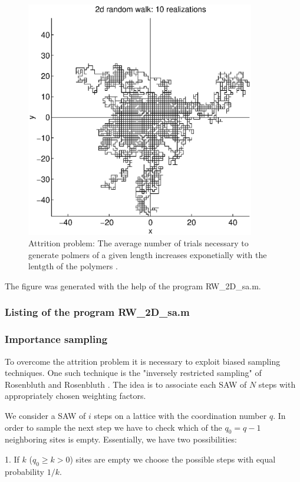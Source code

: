 \begin{figure}
\label{F_RW_ATTRITION}
\includegraphics[width=10cm]{./Figures/f_rw_2d.eps}
\caption{Attrition problem: The average number of trials necessary to 
generate polmers of a given length increases exponetially with the
lentgth of the polymers .}
\end{figure}
The figure was generated with the help of the program {\sf 
RW\_2D\_sa.m}.
\subsubsection{Listing of the program RW\_2D\_sa.m}

\subsubsection{Importance sampling}
To overcome the attrition problem it is necessary to exploit 
biased sampling techniques. One such technique is the "inversely
restricted sampling" of Rosenbluth and Rosenbluth \cite{ROSENBLUTH}. 
The idea is to
associate each SAW of $N$ steps with appropriately chosen weighting 
factors. 

We consider a SAW of $i$ steps on a lattice with the coordination 
number $q$. In order to sample the next step we have to check  
which of the $q_0 = q-1$ neighboring sites is empty. Essentially,
we have two possibilities:

1. If $k$ ($q_0 \ge k >0$) sites are empty we choose the possible 
steps with equal probability $1/k$.


